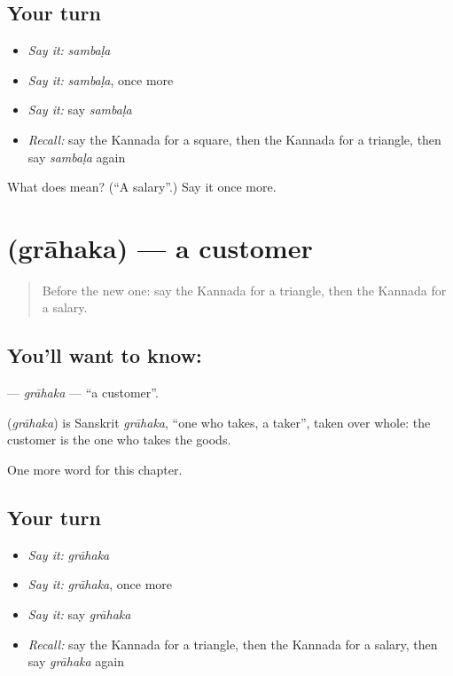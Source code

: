 \subsection*{Your turn}
\begin{itemize}
\raggedright
  \item \emph{Say it:} \emph{sambaḷa}
  \item \emph{Say it:} \emph{sambaḷa}, once more
  \item \emph{Say it:} say \emph{sambaḷa}
  \item \emph{Recall:} say the Kannada for a square, then the Kannada for a triangle, then say \emph{sambaḷa} again
\end{itemize}

\begin{tcolorbox}[breakable,colback=teal!4,colframe=teal!35!black,title={Before you move on}]
What does  mean? (\textquotedblleft{}A salary\textquotedblright{}.) Say it once more.
\end{tcolorbox}
\section[\texorpdfstring{\kn{ಗ್ರಾಹಕ} (grāhaka)}{ಗ್ರಾಹಕ (grāhaka)}]{ (grāhaka) — a customer}

\label{lesson:KA-C194-grahaka}



\begin{quote}
Before the new one: say the Kannada for a triangle, then the Kannada for a salary.
\end{quote}

\subsection*{You'll want to know: }
\textbf{} — \emph{grāhaka} — \textquotedblleft{}a customer\textquotedblright{}.

\begin{cousinweb}
\textbf{} (\emph{grāhaka}) is Sanskrit \emph{grāhaka}, \textquotedblleft{}one who takes, a taker\textquotedblright{}, taken over whole: the customer is the one who takes the goods.
\end{cousinweb}

\begin{grammarlens}[title={What you've built}]
One more word for this chapter.
\end{grammarlens}

\subsection*{Your turn}
\begin{itemize}
\raggedright
  \item \emph{Say it:} \emph{grāhaka}
  \item \emph{Say it:} \emph{grāhaka}, once more
  \item \emph{Say it:} say \emph{grāhaka}
  \item \emph{Recall:} say the Kannada for a triangle, then the Kannada for a salary, then say \emph{grāhaka} again
\end{itemize}

